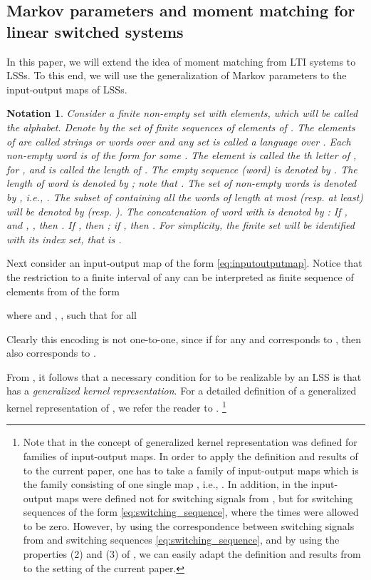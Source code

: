 \documentclass[journal]{IEEEtran}
\newtheorem{Notation}{Notation}
\begin{document}
\subsection{Markov parameters and moment matching for linear switched systems}

In this paper, we will extend the idea of moment matching from LTI systems to LSSs. To this end, we will use the generalization of Markov parameters to the input-output maps of LSSs.

\begin{Notation} \label{Notation1}
	Consider a finite non-empty set  with  elements, which will be called the \emph{alphabet}. Denote by  the set of finite sequences of elements of . The elements of  are called \emph{strings} or \emph{words} over  and any set  is called a \emph{language} over . Each non-empty word  is of the form  for some . The element  is called the \emph{th letter of }, for , and  is called the \emph{length} of . The \emph{empty sequence (word)} is denoted by . The length of word  is denoted by ; note that . The set of non-empty words is denoted by , i.e., . The subset of  containing all the words of length at most (resp. at least)  will be denoted by  (resp. ). The \emph{concatenation} of word  with  is denoted by : If , and  , , then . If , then ; if , then . For simplicity, the finite set  will be identified with its index set, that is .
\end{Notation}

Next consider an input-output map  of the form \eqref{eq:inputoutputmap}. Notice that the restriction to a finite interval  of any  can be interpreted as finite sequence of elements from  of the form

where  and , , such that for all 

Clearly this encoding is not one-to-one, since if  for any  and  corresponds to , then  also corresponds to .

From \cite{MP:BigArticlePartI}, it follows that a necessary condition for  to be realizable by an LSS is that  has a \emph{generalized kernel representation}. For a detailed definition of a generalized kernel representation of , we refer the reader to \cite[Definition 19]{MP:BigArticlePartI}.
\footnote{Note that in \cite{MP:BigArticlePartI} the concept of generalized kernel representation was defined for families of input-output maps. In order to apply the definition and results of \cite{MP:BigArticlePartI} to the current paper, one has to take a family of input-output maps  which is the family consisting of one single map , i.e., . In addition, in \cite{MP:BigArticlePartI} the input-output maps were defined not for switching signals from , but for switching sequences of the form \eqref{eq:switching_sequence}, where the times  were allowed to be zero. However, by using the correspondence between switching signals from  and switching sequences \eqref{eq:switching_sequence}, and by using the properties (2) and (3) of \cite[Definition 19]{MP:BigArticlePartI}, we can easily adapt the definition and results from \cite{MP:BigArticlePartI} to the setting of the current paper.}
\end{document}
